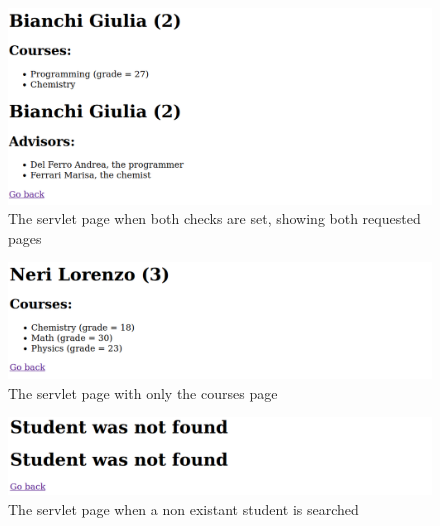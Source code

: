 \documentclass[12pt, a4paper]{article}
\begin{document}
  \begin{figure}[H]
    \centering
    \includegraphics[width=\columnwidth]{full_page.png}
    \caption{The servlet page when both checks are set, showing both requested pages}
  \end{figure}

  \begin{figure}[H]
    \centering
    \includegraphics[width=\columnwidth]{only_one_page.png}
    \caption{The servlet page with only the courses page}
  \end{figure}

  \begin{figure}[H]
    \centering
    \includegraphics[width=\columnwidth]{no_student_found.png}
    \caption{The servlet page when a non existant student is searched}
  \end{figure}

  \pagebreak
\end{document}
